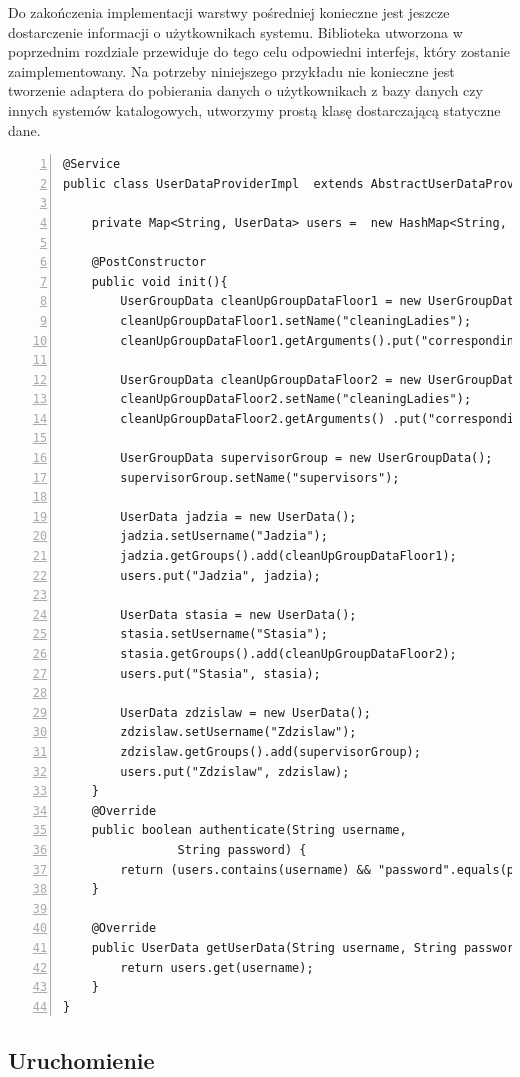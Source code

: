 Do zakończenia implementacji warstwy pośredniej konieczne jest jeszcze dostarczenie informacji o użytkownikach systemu. Biblioteka utworzona w poprzednim rozdziale przewiduje do tego celu odpowiedni interfejs, który zostanie zaimplementowany. Na potrzeby niniejszego przykładu nie konieczne jest tworzenie adaptera do pobierania danych o użytkownikach z bazy danych czy innych systemów katalogowych, utworzymy prostą klasę dostarczającą statyczne dane. 

\begin{lstlisting}[caption=Dostawca informacji o użytkownikach. =,numbers=left]
@Service
public class UserDataProviderImpl  extends AbstractUserDataProvider {

	private Map<String, UserData> users =  new HashMap<String, UserData>();

	@PostConstructor
	public void init(){
		UserGroupData cleanUpGroupDataFloor1 = new UserGroupData();
		cleanUpGroupDataFloor1.setName("cleaningLadies");
		cleanUpGroupDataFloor1.getArguments().put("correspondingFloor", 1);

		UserGroupData cleanUpGroupDataFloor2 = new UserGroupData();
		cleanUpGroupDataFloor2.setName("cleaningLadies");
		cleanUpGroupDataFloor2.getArguments() .put("correspondingFloor", 2);

		UserGroupData supervisorGroup = new UserGroupData();
		supervisorGroup.setName("supervisors");

		UserData jadzia = new UserData();
		jadzia.setUsername("Jadzia");
		jadzia.getGroups().add(cleanUpGroupDataFloor1);
		users.put("Jadzia", jadzia);

		UserData stasia = new UserData();
		stasia.setUsername("Stasia");
		stasia.getGroups().add(cleanUpGroupDataFloor2);
		users.put("Stasia", stasia);

		UserData zdzislaw = new UserData();
		zdzislaw.setUsername("Zdzislaw");
		zdzislaw.getGroups().add(supervisorGroup);
		users.put("Zdzislaw", zdzislaw);
	}
	@Override
	public boolean authenticate(String username, 
				String password) {
		return (users.contains(username) && "password".equals(password));
	}

	@Override
	public UserData getUserData(String username, String password) {
		return users.get(username);
	}
}
\end{lstlisting}

\subsection{Uruchomienie}

